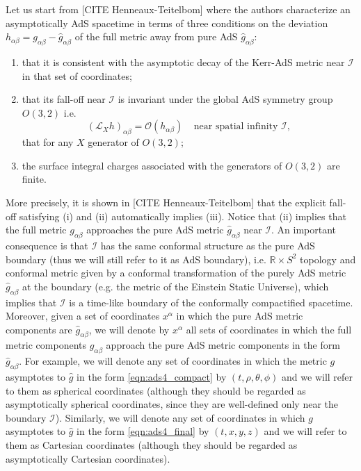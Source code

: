 \documentclass[a4paper,11pt]{article}
\numberwithin{equation}{section}
\begin{document}
Let us start from [CITE Henneaux-Teitelbom] where the authors characterize an asymptotically AdS spacetime in terms of three conditions on the deviation $h_{\alpha\beta}=g_{\alpha\beta}-\hat{g}_{\alpha\beta}$ of the full metric away from pure AdS $\hat{g}_{\alpha\beta}$:
\begin{enumerate}
\item that it is consistent with the asymptotic decay of the Kerr-AdS metric near $\mathcal{I}$ in that set of coordinates;
\item that its fall-off near $\mathcal{I}$ is invariant under the global AdS symmetry group $O(3,2)$ i.e.
\begin{equation}\label{eqn:asyKilleq}
(\mathcal{L}_X h)_{\alpha\beta}=\mathcal{O}(h_{\alpha\beta})\;\;\;\; \textrm{near spatial infinity $\mathcal{I}$},
\end{equation}
that for any $X$ generator of $O(3,2)$;
\item the surface integral charges associated with the generators of $O(3,2)$ are finite.
\end{enumerate}
More precisely, it is shown in [CITE Henneaux-Teitelbom] that the explicit fall-off satisfying (i) and (ii) automatically implies (iii).
Notice that (ii) implies that the full metric $g_{\alpha\beta}$ approaches the pure AdS metric $\hat{g}_{\alpha\beta}$ near $\mathcal{I}$. An important consequence is that $\mathcal{I}$ has the same conformal structure as the pure AdS boundary (thus we will still refer to it as AdS boundary), i.e. $\mathbb{R}\times S^2$ topology and conformal metric given by a conformal transformation of the purely AdS metric $\hat{g}_{\alpha\beta}$ at the boundary (e.g. the metric of the Einstein Static Universe), which implies that $\mathcal{I}$ is a time-like boundary of the conformally compactified spacetime. Moreover, given a set of coordinates $x^\alpha$ in which the pure AdS metric components are $\hat{g}_{\alpha\beta}$, we will denote by $x^\alpha$ all sets of coordinates in which the full metric components $g_{\alpha\beta}$ approach the pure AdS metric components in the form $\hat{g}_{\alpha\beta}$. For example, we will denote any set of coordinates in which the metric $g$ asymptotes to $\hat{g}$ in the form \eqref{eqn:ads4_compact} by $(t,\rho,\theta,\phi)$ and we will refer to them as spherical coordinates (although they should be regarded as asymptotically spherical coordinates, since they are well-defined only near the boundary $\mathcal{I}$). Similarly, we will denote any set of coordinates in which $g$ asymptotes to $\hat{g}$ in the form \eqref{eqn:ads4_final} by $(t,x,y,z)$ and we will refer to them as Cartesian coordinates (although they should be regarded as asymptotically Cartesian coordinates).
\end{document}
